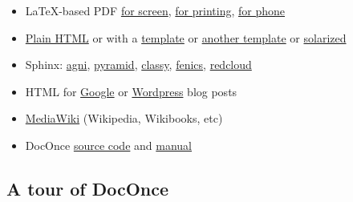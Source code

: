 \documentclass[%
oneside,                 %
final,                   %
10pt]{article}
\newcounter{doconce:movie:counter}
\begin{document}
\begin{itemize}
 \item LaTeX-based PDF \href{{https://hplgit.github.com/teamods/writing_reports/_static/report.pdf}}{for screen}, \href{{https://hplgit.github.com/teamods/writing_reports/_static/report_4printing.pdf}}{for printing}, \href{{https://hplgit.github.com/teamods/writing_reports/_static/report_4phone.pdf}}{for phone}

 \item \href{{https://hplgit.github.com/teamods/writing_reports/_static/report_do.html}}{Plain HTML} or with a \href{{https://hplgit.github.com/teamods/writing_reports/_static/report_vagrant.html}}{template} or \href{{https://hplgit.github.com/teamods/writing_reports/_static/report_github_minimal.html}}{another template} or \href{{https://hplgit.github.com/teamods/writing_reports/_static/report_solarized.html}}{solarized}

 \item Sphinx: \href{{https://hplgit.github.com/teamods/writing_reports/_static/sphinx-agni/index.html}}{agni}, \href{{https://hplgit.github.com/teamods/writing_reports/_static/sphinx-pyramid/report.html}}{pyramid}, \href{{https://hplgit.github.com/teamods/writing_reports/_static/sphinx-classy/report.html}}{classy}, \href{{https://hplgit.github.com/teamods/writing_reports/_static/sphinx-fenics_minimal/report.html}}{fenics}, \href{{https://hplgit.github.com/teamods/writing_reports/_static/sphinx-fenics_minimal/report.html}}{redcloud}

 \item HTML for \href{{https://doconce-report-demo.blogspot.no/}}{Google} or \href{{https://doconcereportdemo.wordpress.com/}}{Wordpress} blog posts

 \item \href{{https://doconcedemo.shoutwiki.com/wiki/DocOnce_demo_page}}{MediaWiki} (Wikipedia, Wikibooks, etc)

 \item DocOnce \href{{https://hplgit.github.com/teamods/writing_reports/_static/report.do.txt.html}}{source code} and \href{{https://hplgit.github.io/doconce/doc/src/pub/manual/html/manual.html}}{manual}
\end{itemize}

\noindent

\subsection{A tour of DocOnce}
\end{document}
